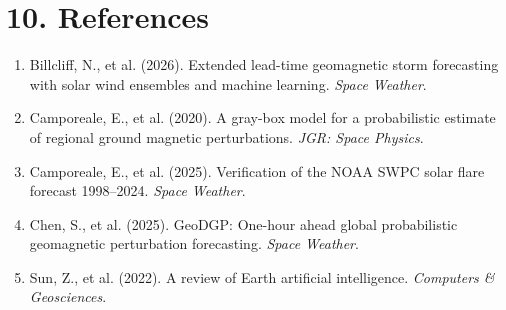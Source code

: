 \documentclass{article}
\begin{document}
\section*{10. References}

\begin{enumerate}
    \item Billcliff, N., et al. (2026). Extended lead-time geomagnetic storm forecasting with solar wind ensembles and machine learning. \textit{Space Weather}.
    \item Camporeale, E., et al. (2020). A gray-box model for a probabilistic estimate of regional ground magnetic perturbations. \textit{JGR: Space Physics}.
    \item Camporeale, E., et al. (2025). Verification of the NOAA SWPC solar flare forecast 1998--2024. \textit{Space Weather}.
    \item Chen, S., et al. (2025). GeoDGP: One-hour ahead global probabilistic geomagnetic perturbation forecasting. \textit{Space Weather}.
    \item Sun, Z., et al. (2022). A review of Earth artificial intelligence. \textit{Computers \& Geosciences}.
\end{enumerate}
\end{document}
